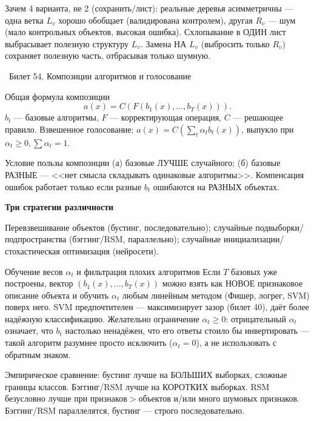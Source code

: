 \documentclass[12pt, a4paper]{article}
\newcommand{\bilet}[2]{%
  \vspace{10pt}%
  \noindent\colorbox{qcolor}{\parbox{\dimexpr\linewidth-2\fboxsep\relax}{%
    \color{white}\large\bfseries\strut\ Билет #1. #2%
  }}%
  \nopagebreak\vspace{5pt}\par\nopagebreak%
}
\newcommand{\qsub}[1]{%
  \vspace{5pt}%
  {\bfseries\color{defblue} #1}%
  \par\vspace{2pt}%
}
\begin{document}
\begin{fishkabox}
Зачем 4 варианта, не 2 (сохранить/лист): реальные деревья асимметричны --- одна ветка $L_v$ хорошо обобщает (валидирована контролем), другая $R_v$ --- шум (мало контрольных объектов, высокая ошибка). Схлопывание в ОДИН лист выбрасывает полезную структуру $L_v$. Замена НА $L_v$ (выбросить только $R_v$) сохраняет полезную часть, отбрасывая только шумную.
\end{fishkabox}

\bilet{54}{Композиции алгоритмов и голосование}

\begin{defbox}{Общая формула композиции}
\[
  a(x) = C(F(b_1(x),\ldots,b_T(x))).
\]
$b_t$ --- базовые алгоритмы, $F$ --- корректирующая операция, $C$ --- решающее правило. Взвешенное голосование: $a(x)=C(\sum_t\alpha_tb_t(x))$, выпукло при $\alpha_t\ge0,\sum\alpha_t=1$.
\end{defbox}

\begin{thmbox}{Условие пользы композиции}
(а) базовые ЛУЧШЕ случайного; (б) базовые РАЗНЫЕ --- <<нет смысла складывать одинаковые алгоритмы>>. Компенсация ошибок работает только если разные $b_t$ ошибаются на РАЗНЫХ объектах.
\end{thmbox}

\qsub{Три стратегии различности}
Перевзвешивание объектов (бустинг, последовательно); случайные подвыборки/подпространства (бэггинг/RSM, параллельно); случайные инициализации/стохастическая оптимизация (нейросети).

\begin{propbox}{Обучение весов $\alpha_t$ и фильтрация плохих алгоритмов}
Если $T$ базовых уже построены, вектор $(b_1(x),\ldots,b_T(x))$ можно взять как НОВОЕ признаковое описание объекта и обучить $\alpha_t$ любым линейным методом (Фишер, логрег, SVM) поверх него. SVM предпочтителен --- максимизирует зазор (билет 40), даёт более надёжную классификацию. Желательно ограничение $\alpha_t\ge0$: отрицательный $\alpha_t$ означает, что $b_t$ настолько ненадёжен, что его ответы стоило бы инвертировать --- такой алгоритм разумнее просто исключить ($\alpha_t{=}0$), а не использовать с обратным знаком.
\end{propbox}

\begin{fishkabox}
Эмпирическое сравнение: бустинг лучше на БОЛЬШИХ выборках, сложные границы классов. Бэггинг/RSM лучше на КОРОТКИХ выборках. RSM безусловно лучше при признаков$>$объектов и/или много шумовых признаков. Бэггинг/RSM параллелятся, бустинг --- строго последовательно.
\end{fishkabox}
\end{document}
